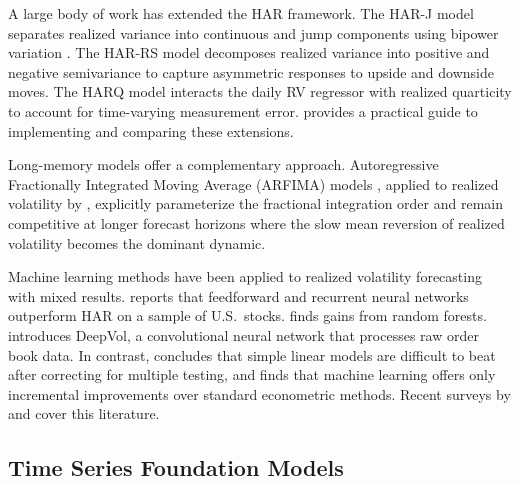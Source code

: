 \documentclass[12pt]{article}
\begin{document}
A large body of work has extended the HAR framework. The HAR-J model \citep{andersen2007roughing} separates realized variance into continuous and jump components using bipower variation \citep{barndorffnielsen2004bipower}. The HAR-RS model \citep{patton2015, barndorffnielsen2010semivariance} decomposes realized variance into positive and negative semivariance to capture asymmetric responses to upside and downside moves. The HARQ model \citep{bollerslev2016harq} interacts the daily RV regressor with realized quarticity to account for time-varying measurement error. \citet{clements2021practical} provides a practical guide to implementing and comparing these extensions.

Long-memory models offer a complementary approach. Autoregressive Fractionally Integrated Moving Average (ARFIMA) models \citep{granger1980, hosking1981}, applied to realized volatility by \citet{andersen2003}, explicitly parameterize the fractional integration order and remain competitive at longer forecast horizons where the slow mean reversion of realized volatility becomes the dominant dynamic.

Machine learning methods have been applied to realized volatility forecasting with mixed results. \citet{bucci2020} reports that feedforward and recurrent neural networks outperform HAR on a sample of U.S.\ stocks. \citet{luong2018} finds gains from random forests. \citet{morenopino2024deepvol} introduces DeepVol, a convolutional neural network that processes raw order book data. In contrast, \citet{branco2024} concludes that simple linear models are difficult to beat after correcting for multiple testing, and \citet{christensen2023ml} finds that machine learning offers only incremental improvements over standard econometric methods. Recent surveys by \citet{gunnarsson2024} and \citet{leushuis2026} cover this literature.

\subsection{Time Series Foundation Models}
\label{subsec:tsfm}
\end{document}
